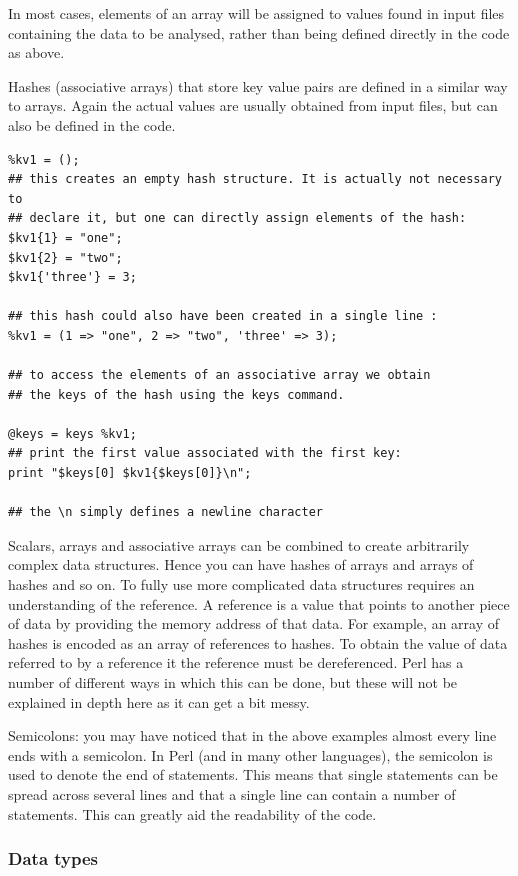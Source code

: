 \documentclass[11pt]{article}
\begin{document}
In most cases, elements of an array will be assigned to values found in
input files containing the data to be analysed, rather than being
defined directly in the code as above.

Hashes (associative arrays) that store key value pairs are defined in a
similar way to arrays. Again the actual values are usually obtained from
input files, but can also be defined in the code.

\begin{verbatim}
%kv1 = ();
## this creates an empty hash structure. It is actually not necessary to
## declare it, but one can directly assign elements of the hash:
$kv1{1} = "one";
$kv1{2} = "two";
$kv1{'three'} = 3;

## this hash could also have been created in a single line :
%kv1 = (1 => "one", 2 => "two", 'three' => 3);

## to access the elements of an associative array we obtain
## the keys of the hash using the keys command.

@keys = keys %kv1;
## print the first value associated with the first key:
print "$keys[0] $kv1{$keys[0]}\n";

## the \n simply defines a newline character
\end{verbatim}


Scalars, arrays and associative arrays can be combined to create
arbitrarily complex data structures. Hence you can have hashes of arrays
and arrays of hashes and so on. To fully use more complicated data
structures requires an understanding of the reference. A reference is a
value that points to another piece of data by providing the memory
address of that data. For example, an array of hashes is encoded as an
array of references to hashes. To obtain the value of data referred to
by a reference it the reference must be dereferenced. Perl has
a number of different ways in which this can be done, but these will not
be explained in depth here as it can get a bit messy. 

Semicolons: you may have noticed that in the above examples almost every
line ends with a semicolon. In Perl (and in many other languages), the
semicolon is used to denote the end of statements. This means
that single statements can be spread across several lines and that a
single line can contain a number of statements. This can greatly aid the
readability of the code.

\subsubsection{Data types}
\label{sec-5-0-3}
\end{document}
